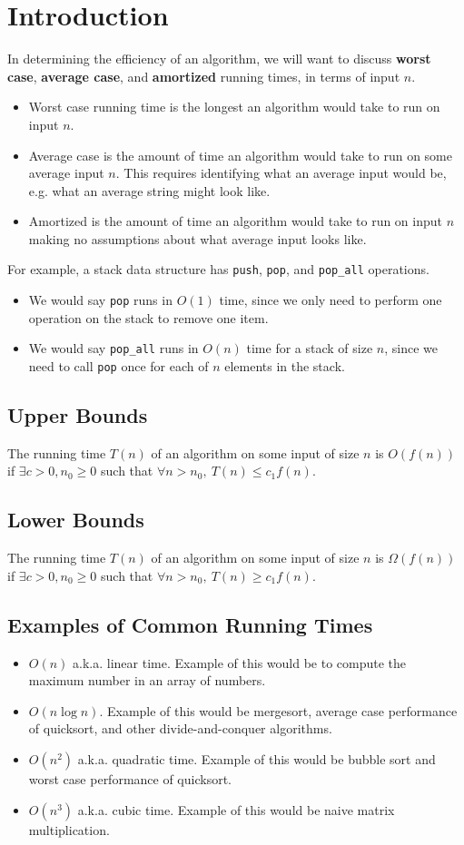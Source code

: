 \section{Introduction}
In determining the efficiency of an algorithm, we will want to discuss \textbf{worst case}, \textbf{average case}, and \textbf{amortized} running times, in terms of input $n$.
\begin{itemize}
  \item Worst case running time is the longest an algorithm would take to run on input $n$.
  \item Average case is the amount of time an algorithm would take to run on some average input $n$. This requires identifying what an average input would be, e.g. what an average string might look like.
  \item Amortized is the amount of time an algorithm would take to run on input $n$ making no assumptions about what average input looks like.
\end{itemize}
For example, a stack data structure has \texttt{push}, \texttt{pop}, and \texttt{pop\_all} operations.
\begin{itemize}
  \item We would say \texttt{pop} runs in $O(1)$ time, since we only need to perform one operation on the stack to remove one item.
  \item We would say \texttt{pop\_all} runs in $O(n)$ time for a stack of size $n$, since we need to call \texttt{pop} once for each of $n$ elements in the stack.
\end{itemize}
\subsection{Upper Bounds}
The running time $T(n)$ of an algorithm on some input of size $n$ is $O(f(n))$ if $\exists c>0, n_0 \geq 0$ such that $\forall n>n_0,\ T(n) \leq c_1 f(n)$.
\subsection{Lower Bounds}
The running time $T(n)$ of an algorithm on some input of size $n$ is $\Omega(f(n))$ if $\exists c>0, n_0 \geq 0$ such that $\forall n>n_0,\ T(n) \geq c_1 f(n)$.
\subsection{Examples of Common Running Times}
\begin{itemize}
  \item $O(n)$ a.k.a. linear time. Example of this would be to compute the maximum number in an array of numbers.
  \item $O(n\log n)$. Example of this would be mergesort, average case performance of quicksort, and other divide-and-conquer algorithms.
  \item $O(n^2)$ a.k.a. quadratic time. Example of this would be bubble sort and worst case performance of quicksort.
  \item $O(n^3)$ a.k.a. cubic time. Example of this would be naive matrix multiplication.
\end{itemize}
